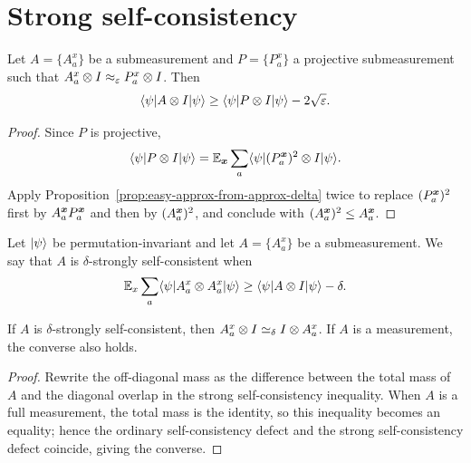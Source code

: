 \section{Strong self-consistency}

\begin{lemma}\label{prop:completeness-transfer-projective-P}
	\leanok
	Let $A=\{A_a^x\}$ be a submeasurement and $P=\{P_a^x\}$ a projective submeasurement such that $A_a^x \otimes I \approx_\varepsilon P_a^x \otimes I$. Then
	\[
		\langle \psi \rvert A \otimes I \lvert \psi \rangle \ge \langle \psi \rvert P \otimes I \lvert \psi \rangle - 2\sqrt{\varepsilon}.
	\]
\end{lemma}
\begin{proof}
	\leanok
	Since $P$ is projective,
	\[
		\langle \psi \rvert P \otimes I \lvert \psi \rangle
		= \mathbb{E}_{{\boldsymbol{x}}} \sum_a \langle \psi \rvert (P^{{\boldsymbol{x}}}_a)^2 \otimes I \lvert \psi \rangle.
	\]
	Apply Proposition~\ref{prop:easy-approx-from-approx-delta} twice to replace $(P^{\boldsymbol{x}}_a)^2$ first by $A^{\boldsymbol{x}}_aP^{\boldsymbol{x}}_a$ and then by $(A^{\boldsymbol{x}}_a)^2$, and conclude with $(A_a^{\boldsymbol{x}})^2 \le A_a^{\boldsymbol{x}}$.
\end{proof}

\begin{definition}\label{def:strong-self-consistency}
	\leanok
	Let $\lvert \psi \rangle$ be permutation-invariant and let $A=\{A_a^x\}$ be a submeasurement. We say that $A$ is $\delta$-strongly self-consistent when
	\[
		\mathbb{E}_x \sum_a \langle \psi \rvert A_a^x \otimes A_a^x \lvert \psi \rangle
		\ge
		\langle \psi \rvert A \otimes I \lvert \psi \rangle - \delta.
	\]
\end{definition}

\begin{lemma}\label{prop:other-two-notions-of-self-consistency}
	\leanok
	If $A$ is $\delta$-strongly self-consistent, then $A_a^x \otimes I \simeq_\delta I \otimes A_a^x$. If $A$ is a measurement, the converse also holds.
\end{lemma}
\begin{proof}
	\leanok
	Rewrite the off-diagonal mass as the difference between the total mass of $A$ and the diagonal overlap in the strong self-consistency inequality.
	When $A$ is a full measurement, the total mass is the identity, so this inequality becomes an equality; hence the ordinary self-consistency defect and the strong self-consistency defect coincide, giving the converse.
\end{proof}

